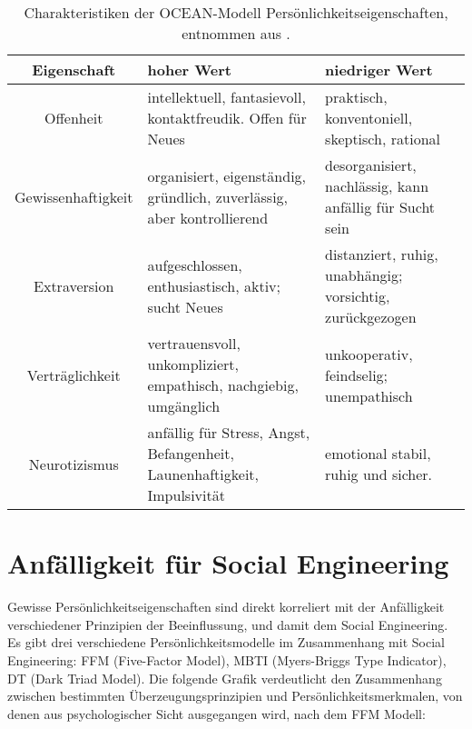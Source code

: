 \begin{table}[!htp]
    \centering
    \begin{tabular}{ |c|m{11em}|m{11em}| }
        \hline
        \textbf{Eigenschaft} & \textbf{hoher Wert}                                                      & \textbf{niedriger Wert}                                   \\
        \hline \hline
        Offenheit            & intellektuell, fantasievoll, kontaktfreudik. Offen für Neues             & praktisch, konventoniell, skeptisch, rational             \\
        \hline
        Gewissenhaftigkeit   & organisiert, eigenständig, gründlich, zuverlässig, aber kontrollierend   & desorganisiert, nachlässig, kann anfällig für Sucht sein  \\
        \hline
        Extraversion         & aufgeschlossen, enthusiastisch, aktiv; sucht Neues                       & distanziert, ruhig, unabhängig; vorsichtig, zurückgezogen \\
        \hline
        Verträglichkeit      & vertrauensvoll, unkompliziert, empathisch, nachgiebig, umgänglich        & unkooperativ, feindselig; unempathisch                    \\
        \hline
        Neurotizismus        & anfällig für Stress, Angst, Befangenheit, Launenhaftigkeit, Impulsivität & emotional stabil, ruhig und sicher.                       \\
        \hline
    \end{tabular}
    \caption{Charakteristiken der OCEAN-Modell Persönlichkeitseigenschaften, entnommen aus .}
\end{table}
\FloatBarrier

\section{Anfälligkeit für Social Engineering}

Gewisse Persönlichkeitseigenschaften sind direkt korreliert mit der Anfälligkeit verschiedener Prinzipien der Beeinflussung, und damit dem Social Engineering.
Es gibt drei verschiedene Persönlichkeitsmodelle im Zusammenhang mit Social Engineering: FFM (Five-Factor Model), MBTI (Myers-Briggs Type Indicator), DT (Dark Triad Model).
Die folgende Grafik verdeutlicht den Zusammenhang zwischen bestimmten Überzeugungsprinzipien und Persönlichkeitsmerkmalen, von denen aus psychologischer Sicht ausgegangen wird, nach dem FFM Modell:

